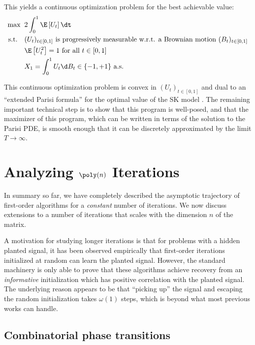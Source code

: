 \documentclass[12pt]{article}
\begin{document}
This yields a continuous optimization problem for the best achievable value:
\begin{align*}
    \max \;\;& 2\int_0^1 \E\left[U_t\right] \dt\\
    \textnormal{s.t. }\;\;
    &(U_t)_{t \in [0,1]} \text{ is progressively measurable w.r.t. a Brownian motion $(B_t)_{t \in [0,1]}$}\\
    & \E\left[U_t^2\right] = 1 \text{ for all $t \in [0,1]$}\\
    &X_1 = \int_{0}^1 U_t \d B_t \in \{-1, +1\} \text{ a.s.}
\end{align*}

This continuous optimization problem is convex in $(U_t)_{t \in [0,1]}$ and dual to an ``extended Parisi formula'' for the optimal value of the SK model \cite[Section 4]{AMS20:pSpinGlasses}.
The remaining important technical step is to show that this program is well-posed, and that the maximizer of this program, which can be written in terms of the solution to the Parisi PDE, is smooth enough that it can be discretely approximated by the limit $T \to \infty$.
  
\section{Analyzing \texorpdfstring{$\poly(n)$}{poly(n)} Iterations}
\label{sec:polyn-iterations}

In summary so far, we have completely described the asymptotic trajectory of first-order algorithms for a \textit{constant} number of iterations.
We now discuss extensions to a number of iterations that scales with the dimension $n$ of the matrix.

A motivation for studying longer iterations is that
for problems with a hidden planted signal, it has been observed empirically that first-order iterations initialized at random can learn the planted signal. However, the standard machinery is only able to prove that these algorithms achieve recovery from an \emph{informative} initialization which has positive correlation with the planted signal. The underlying reason appears to be that ``picking up'' the signal and escaping the random initialization takes $\omega(1)$ steps, which is beyond what most previous works can handle.





\subsection{Combinatorial phase transitions}
\label{sec:combi-obstructions}
\end{document}
